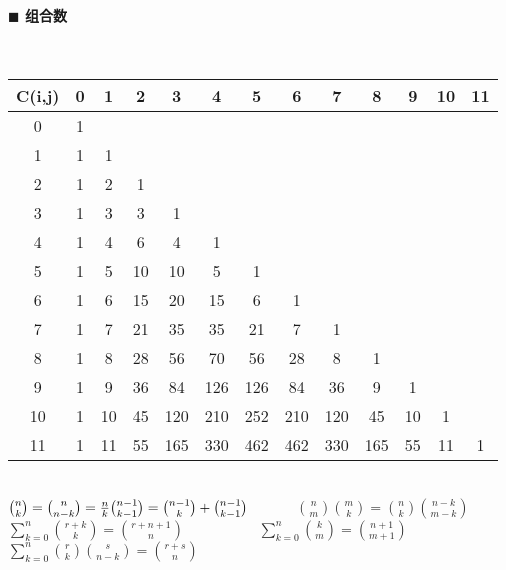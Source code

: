 \paragraph{$\blacksquare$ 组合数}
\noindent \\
\begin{tabular}{|c|c|c|c|c|c|c|c|c|c|c|c|c|}
\hline C(i,j)&0&1&2&3&4&5&6&7&8&9&10&11\\
\hline 0&1&&&&&&&&&&& \\
\hline 1&1&1&&&&&&&&&&\\
\hline 2&1&2&1&&&&&&&&&\\
\hline 3&1&3&3&1&&&&&&&&\\
\hline 4&1&4&6&4&1&&&&&&&\\
\hline 5&1&5&10&10&5&1&&&&&&\\
\hline 6&1&6&15&20&15&6&1&&&&&\\
\hline 7&1&7&21&35&35&21&7&1&&&&\\
\hline 8&1&8&28&56&70&56&28&8&1&&&\\
\hline 9&1&9&36&84&126&126&84&36&9&1&&\\
\hline 10&1&10&45&120&210&252&210&120&45&10&1&\\
\hline 11&1&11&55&165&330&462&462&330&165&55&11&1\\
\hline
\end{tabular}\\
${n \choose k} = {n \choose n-k} = {n\over k}{n-1 \choose k-1} = {n -1 \choose k} + {n-1 \choose k-1}$~~~~~~
${n \choose m}{m \choose k} = { n \choose k} { n-k \choose m-k}$\\
${\displaystyle \sum_{k=0}^n {r+k \choose k} = { r+ n+1 \choose n}}$~~~~~~~~~~
${\displaystyle \sum_{k=0}^n {k \choose m} = { n+1 \choose m+1}}$\\
${\displaystyle \sum_{k=0}^n {r \choose k}{s \choose n -k} = {r+s \choose n}}$\\
